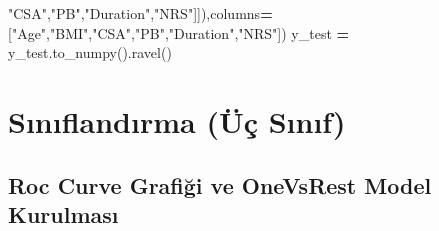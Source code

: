 \documentclass[12pt,twoside]{deuthesis}
\newenvironment{Shaded}{\begin{snugshade}}{\end{snugshade}}
\newcommand{\NormalTok}[1]{#1}
\newcommand{\OperatorTok}[1]{\textcolor[rgb]{0.81,0.36,0.00}{\textbf{#1}}}
\newcommand{\StringTok}[1]{\textcolor[rgb]{0.31,0.60,0.02}{#1}}
\begin{document}
\begin{Shaded}
\begin{Highlighting}[]
\StringTok{"CSA"}\NormalTok{,}\StringTok{"PB"}\NormalTok{,}\StringTok{"Duration"}\NormalTok{,}\StringTok{"NRS"}\NormalTok{]]),columns}\OperatorTok{=}\NormalTok{[}\StringTok{"Age"}\NormalTok{,}\StringTok{"BMI"}\NormalTok{,}\StringTok{"CSA"}\NormalTok{,}\StringTok{"PB"}\NormalTok{,}\StringTok{"Duration"}\NormalTok{,}\StringTok{"NRS"}\NormalTok{])}
\NormalTok{y\_test }\OperatorTok{=}\NormalTok{ y\_test.to\_numpy().ravel()}
\end{Highlighting}
\end{Shaded}
\normalsize

\hypertarget{sux131nux131flandux131rma-uxfcuxe7-sux131nux131f}{%
\chapter{Sınıflandırma (Üç Sınıf)}\label{sux131nux131flandux131rma-uxfcuxe7-sux131nux131f}}

\hypertarget{roc-curve-grafiux11fi-ve-onevsrest-model-kurulmasux131}{%
\section{Roc Curve Grafiği ve OneVsRest Model Kurulması}\label{roc-curve-grafiux11fi-ve-onevsrest-model-kurulmasux131}}
\end{document}
